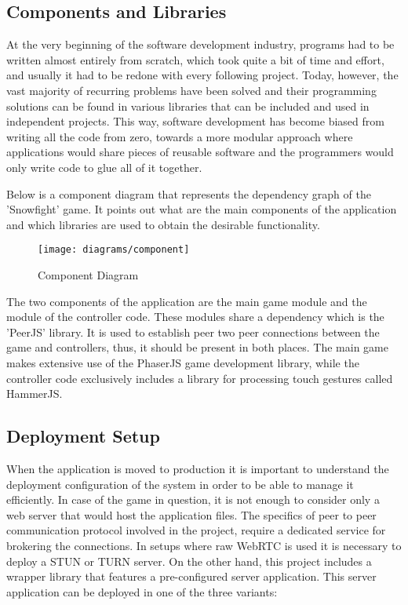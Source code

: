 \newpage

\subsection{Components and Libraries}

At the very beginning of the software development industry, programs had to be
written almost entirely from scratch, which took quite a bit of time and effort,
and usually it had to be redone with every following project. Today, however,
the vast majority of recurring problems have been solved and their programming
solutions can be found in various libraries that can be included and used in
independent projects. This way, software development has become biased from
writing all the code from zero, towards a more modular approach where
applications would share pieces of reusable software and the programmers would
only write code to glue all of it together.

Below is a component diagram that represents the dependency graph of the
'Snowfight' game. It points out what are the main components of the application
and which libraries are used to obtain the desirable functionality.

\begin{figure}[!h]
\centering
\texttt{[image: diagrams/component]}
\caption{Component Diagram}\label{diag:component}
\end{figure}

The two components of the application are the main game module and the module of
the controller code. These modules share a dependency which is the 'PeerJS'
library. It is used to establish peer two peer connections between the game and
controllers, thus, it should be present in both places. The main game makes
extensive use of the PhaserJS game development library, while the controller
code exclusively includes a library for processing touch gestures called
HammerJS.

\newpage

\subsection{Deployment Setup}

When the application is moved to production it is important to understand the
deployment configuration of the system in order to be able to manage it
efficiently. In case of the game in question, it is not enough to consider only
a web server that would host the application files. The specifics of peer to
peer communication protocol involved in the project, require a dedicated service
for brokering the connections. In setups where raw WebRTC is used it is
necessary to deploy a STUN or TURN server. On the other hand, this project
includes a wrapper library that features a pre-configured server application.
This server application can be deployed in one of the three variants:

